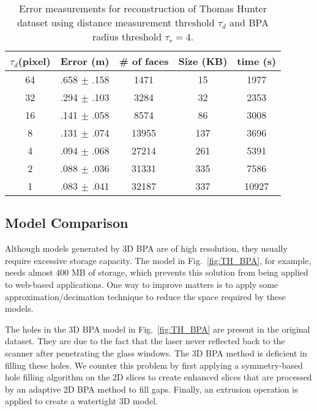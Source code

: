 \documentclass[10pt, conference, compsocconf]{IEEEtran}
\newcommand{\Fig}[1]{Fig.~\ref{fig:#1}}
\begin{document}
\begin{table}[hbtp]
\begin{center}
\begin{tabular}[t]{||c||c|c|c|c||}
\hline
$\tau_d $(pixel) & Error (m)& \# of faces & Size (KB) & time (s) \\ \hline \hline
64 & .658 $\pm$ .158 & 1471  & 15  & 1977 \\ \hline
32 & .294 $\pm$ .103 & 3284  & 32  & 2353 \\ \hline
16 & .141 $\pm$ .058 & 8574  & 86  & 3008 \\ \hline
8  & .131 $\pm$ .074 & 13955 & 137 & 3696 \\ \hline
4  & .094 $\pm$ .068 & 27214 & 261 & 5391 \\ \hline
2  & .088 $\pm$ .036 & 31331 & 335 & 7586 \\ \hline
1  & .083 $\pm$ .041 & 32187 & 337 & 10927\\ \hline
\end{tabular}
\end{center}
\caption{Error measurements for reconstruction of Thomas Hunter dataset using
distance measurement threshold $\tau_d$ and BPA radius threshold $\tau_r = 4$.}
\label{tbl:em}
\end{table}

\subsection{Model Comparison}

Although models generated by 3D BPA are of high resolution, they usually
require excessive storage capacity.
The model in \Fig{TH_BPA}, for example, needs almost 400 MB of storage,
which prevents this solution from being applied to web-based applications.
One way to improve matters is to apply some approximation/decimation
technique to reduce the space required by these models.

The holes in the 3D BPA model in \Fig{TH_BPA} are present in the
original dataset.
They are due to the fact that the laser never reflected back to
the scanner after penetrating the glass windows.
The 3D BPA method is deficient in filling these holes.
We counter this problem by first applying a symmetry-based hole filling
algorithm on the 2D slices to create enhanced slices that are processed
by an adaptive 2D BPA method to fill gaps.
Finally, an extrusion operation is applied to create a watertight 3D model.
\end{document}
